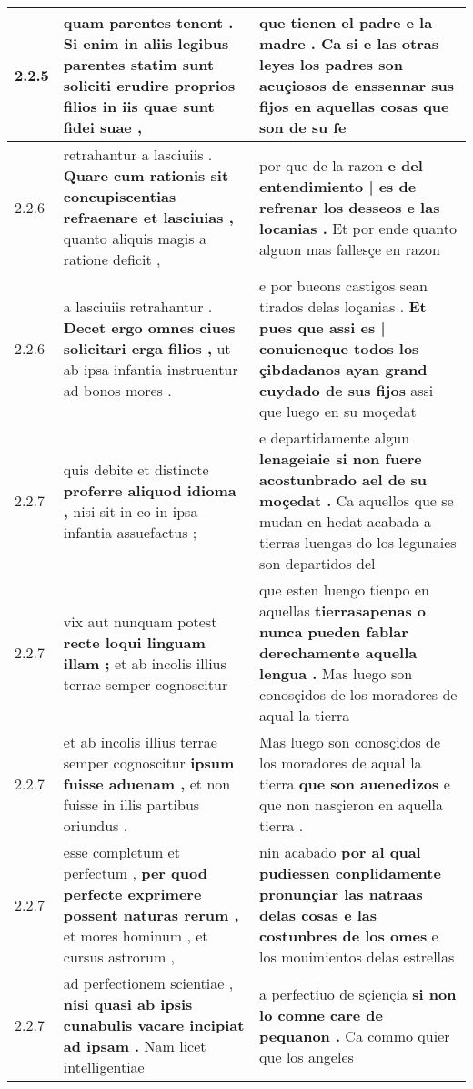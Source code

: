 \begin{tabular}{|p{1cm}|p{6.5cm}|p{6.5cm}|}
2.2.5 & quam parentes tenent . \textbf{ Si enim in aliis legibus parentes statim sunt soliciti erudire proprios filios } in iis quae sunt fidei suae , & que tienen el padre e la madre . \textbf{ Ca si e las otras leyes los padres son acuçiosos de enssennar sus fijos en aquellas cosas } que son de su fe \\\hline
2.2.6 & retrahantur a lasciuiis . \textbf{ Quare cum rationis sit concupiscentias refraenare et lasciuias , } quanto aliquis magis a ratione deficit , & por que de la razon \textbf{ e del entendimiento | es de refrenar los desseos e las locanias . } Et por ende quanto alguon mas fallesçe en razon \\\hline
2.2.6 & a lasciuiis retrahantur . \textbf{ Decet ergo omnes ciues solicitari erga filios , } ut ab ipsa infantia instruentur ad bonos mores . & e por bueons castigos sean tirados delas loçanias . \textbf{ Et pues que assi es | conuieneque todos los çibdadanos ayan grand cuydado de sus fijos } assi que luego en su moçedat \\\hline
2.2.7 & quis debite et distincte \textbf{ proferre aliquod idioma , } nisi sit in eo in ipsa infantia assuefactus ; & e departidamente algun \textbf{ lenageiaie si non fuere acostunbrado ael de su moçedat . } Ca aquellos que se mudan en hedat acabada a tierras luengas do los legunaies son departidos del \\\hline
2.2.7 & vix aut nunquam potest \textbf{ recte loqui linguam illam ; } et ab incolis illius terrae semper cognoscitur & que esten luengo tienpo en aquellas \textbf{ tierrasapenas o nunca pueden fablar derechamente aquella lengua . } Mas luego son conosçidos de los moradores de aqual la tierra \\\hline
2.2.7 & et ab incolis illius terrae semper cognoscitur \textbf{ ipsum fuisse aduenam , } et non fuisse in illis partibus oriundus . & Mas luego son conosçidos de los moradores de aqual la tierra \textbf{ que son auenedizos } e que non nasçieron en aquella tierra . \\\hline
2.2.7 & esse completum et perfectum , \textbf{ per quod perfecte exprimere possent naturas rerum , } et mores hominum , et cursus astrorum , & nin acabado \textbf{ por al qual pudiessen conplidamente pronunçiar las natraas delas cosas e las costunbres de los omes } e los mouimientos delas estrellas \\\hline
2.2.7 & ad perfectionem scientiae , \textbf{ nisi quasi ab ipsis cunabulis vacare incipiat ad ipsam . } Nam licet intelligentiae & a perfectiuo de sçiençia \textbf{ si non lo comne care de pequanon . } Ca commo quier que los angeles \\\hline

\end{tabular}
